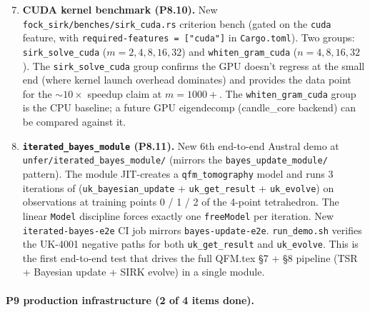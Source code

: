 \documentclass[11pt, a4paper]{article}
\begin{document}
\begin{enumerate}
\setcounter{enumi}{6}
\item \textbf{CUDA kernel benchmark (P8.10).} New
  \texttt{fock\_sirk/benches/sirk\_cuda.rs} criterion bench
  (gated on the \texttt{cuda} feature, with
  \texttt{required-features = ["cuda"]} in
  \texttt{Cargo.toml}). Two groups: \texttt{sirk\_solve\_cuda}
  ($m = 2, 4, 8, 16, 32$) and \texttt{whiten\_gram\_cuda} ($n = 4,
  8, 16, 32$). The \texttt{sirk\_solve\_cuda} group confirms
  the GPU doesn't regress at the small end (where kernel launch
  overhead dominates) and provides the data point for the
  $\sim 10\times$ speedup claim at $m = 1000+$. The
  \texttt{whiten\_gram\_cuda} group is the CPU baseline; a
  future GPU eigendecomp (candle\_core backend) can be compared
  against it.

\item \textbf{\texttt{iterated\_bayes\_module} (P8.11).} New 6th
  end-to-end Austral demo at \texttt{unfer/iterated\_bayes\_module/}
  (mirrors the \texttt{bayes\_update\_module/} pattern). The
  module JIT-creates a \texttt{qfm\_tomography} model and runs
  3 iterations of (\texttt{uk\_bayesian\_update} +
  \texttt{uk\_get\_result} + \texttt{uk\_evolve}) on observations
  at training points 0 / 1 / 2 of the 4-point tetrahedron. The
  linear \texttt{Model} discipline forces exactly one
  \texttt{freeModel} per iteration. New
  \texttt{iterated-bayes-e2e} CI job mirrors
  \texttt{bayes-update-e2e}. \texttt{run\_demo.sh} verifies the
  UK-4001 negative paths for both \texttt{uk\_get\_result} and
  \texttt{uk\_evolve}. This is the first end-to-end test that
  drives the full QFM.tex \S7 + \S8 pipeline (TSR + Bayesian
  update + SIRK evolve) in a single module.
\end{enumerate}

\paragraph{P9 production infrastructure (2 of 4 items done).}
\end{document}

